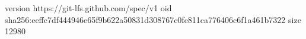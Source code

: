 version https://git-lfs.github.com/spec/v1
oid sha256:eeffc7df444946e65f9b622a50831d308767c0fe811ca776406c6f1a461b7322
size 12980
